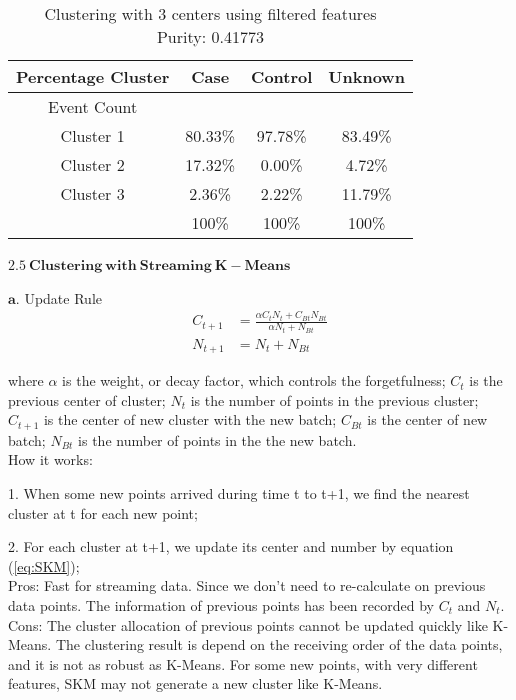 \documentclass[12pt]{article}
\begin{document}
\begin{table}[th]
\centering
\begin{tabular}{@{}c|c|c|c}
\hline
Percentage Cluster & Case & Control & Unknown  \\ \hline
Event Count & & &  \\ 
Cluster 1 & 80.33\% & 97.78\%  & 83.49\%\\
Cluster 2  & 17.32\%  & 0.00\% & 4.72\%\\
Cluster 3  & 2.36\%  & 2.22\%  & 11.79\% \\ \hline
  & 100\%  & 100\%  & 100\% \\ \hline
\end{tabular}
\caption{Clustering with 3 centers using filtered features\\ Purity: 0.41773}
\end{table} 



\newpage
$\mathbf{2.5 \ Clustering \ with \ Streaming \ K-Means }$
$\mathbf{}$

$\mathbf{a.}$
Update Rule
\begin{equation}
\begin{aligned}
C_{t+1} & = \frac{\alpha C_t N_t + C_{Bt} N_{Bt}} {\alpha N_t + N_{Bt}}\\
N_{t+1}& = N_t + N_{Bt}
\end{aligned} 
\label{eq:SKM}
\end{equation}

where $\alpha$ is the weight, or decay factor, which controls the forgetfulness;
$C_t$ is the previous center of cluster;
$N_t$ is the number of points in the previous cluster;
$C_{t+1}$ is the center of new cluster with the new batch;
$C_{Bt}$ is the center of new batch;
$N_{Bt}$ is the number of points in the the new batch.\\

How it works:

1. When some new points arrived during time t to t+1, we find the nearest cluster at t for each new point;

2. For each cluster at t+1, we update its center and number by equation (\ref{eq:SKM});\\


Pros:
Fast for streaming data. Since we don't need to re-calculate on previous data points. The information of previous points has been recorded by $C_t$ and $N_t$.\\

Cons:
The cluster allocation of previous points cannot be updated quickly like K-Means. The clustering result is depend on the receiving order of the data points, and it is not as robust as K-Means. For some new points, with very different features, SKM may not generate a new cluster like K-Means. \\
\end{document}
